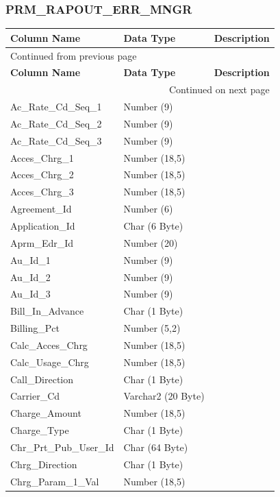 \documentclass[12pt,twoside]{article}
\begin{document}
\normalsize
\subsubsection{PRM\_RAPOUT\_ERR\_MNGR}
\label{sec:orgheadline128}
\footnotesize

\begin{longtable}{l|l|l}
\hline
\textbf{Column Name} & \textbf{Data Type} & \textbf{Description}\\
\hline
\endfirsthead
\multicolumn{3}{l}{Continued from previous page} \\
\hline

\textbf{Column Name} & \textbf{Data Type} & \textbf{Description} \\

\hline
\endhead
\hline\multicolumn{3}{r}{Continued on next page} \\
\endfoot
\endlastfoot
\hline
Ac\_Rate\_Cd\_Seq\_1 & Number (9) & \\
Ac\_Rate\_Cd\_Seq\_2 & Number (9) & \\
Ac\_Rate\_Cd\_Seq\_3 & Number (9) & \\
Acces\_Chrg\_1 & Number (18,5) & \\
Acces\_Chrg\_2 & Number (18,5) & \\
Acces\_Chrg\_3 & Number (18,5) & \\
Agreement\_Id & Number (6) & \\
Application\_Id & Char (6 Byte) & \\
Aprm\_Edr\_Id & Number (20) & \\
Au\_Id\_1 & Number (9) & \\
Au\_Id\_2 & Number (9) & \\
Au\_Id\_3 & Number (9) & \\
Bill\_In\_Advance & Char (1 Byte) & \\
Billing\_Pct & Number (5,2) & \\
Calc\_Acces\_Chrg & Number (18,5) & \\
Calc\_Usage\_Chrg & Number (18,5) & \\
Call\_Direction & Char (1 Byte) & \\
Carrier\_Cd & Varchar2 (20 Byte) & \\
Charge\_Amount & Number (18,5) & \\
Charge\_Type & Char (1 Byte) & \\
Chr\_Prt\_Pub\_User\_Id & Char (64 Byte) & \\
Chrg\_Direction & Char (1 Byte) & \\
Chrg\_Param\_1\_Val & Number (18,5) & \\

\end{longtable}
\end{document}
